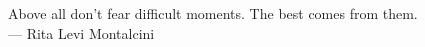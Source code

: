 
\cleardoublepage
{}
\thispagestyle{empty}

\vspace*{3cm}

\begin{center}
Above all don't fear difficult moments. The best comes from them. \\ \medskip
--- Rita Levi Montalcini
\end{center}

\medskip

